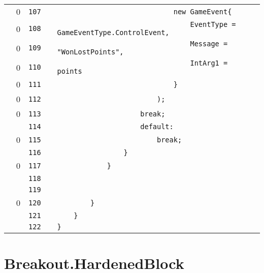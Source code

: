 \documentclass[a4paper,landscape,10pt]{article}
\begin{document}
\begin{longtable}[l]{lrrll}
\cellcolor{red} & 0 & \verb~107~ & & \verb~                            new GameEvent{~\\
\cellcolor{red} & 0 & \verb~108~ & & \verb~                                EventType = GameEventType.ControlEvent,~\\
\cellcolor{red} & 0 & \verb~109~ & & \verb~                                Message = "WonLostPoints",~\\
\cellcolor{red} & 0 & \verb~110~ & & \verb~                                IntArg1 = points~\\
\cellcolor{red} & 0 & \verb~111~ & & \verb~                            }~\\
\cellcolor{red} & 0 & \verb~112~ & & \verb~                        );~\\
\cellcolor{red} & 0 & \verb~113~ & & \verb~                    break;~\\
\cellcolor{gray} &  & \verb~114~ & & \verb~                    default:~\\
\cellcolor{red} & 0 & \verb~115~ & & \verb~                        break;~\\
\cellcolor{gray} &  & \verb~116~ & & \verb~                }~\\
\cellcolor{red} & 0 & \verb~117~ & & \verb~            }~\\
\cellcolor{gray} &  & \verb~118~ & & \verb~~\\
\cellcolor{gray} &  & \verb~119~ & & \verb~~\\
\cellcolor{red} & 0 & \verb~120~ & & \verb~        }~\\
\cellcolor{gray} &  & \verb~121~ & & \verb~    }~\\
\cellcolor{gray} &  & \verb~122~ & & \verb~}~\\
\end{longtable}
\newpage
\section{Breakout.HardenedBlock}
\end{document}
